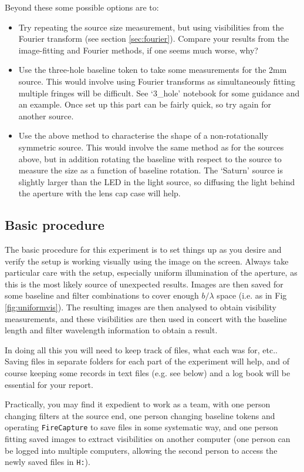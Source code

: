 \documentclass[11pt]{article}
\begin{document}
Beyond these some possible options are to:
\begin{itemize}
    \item Try repeating the source size measurement, but using visibilities from the Fourier transform (see section \ref{sec:fourier}). Compare your results from the image-fitting and Fourier methods, if one seems much worse, why?
    \item Use the three-hole baseline token to take some measurements for the 2mm source. This would involve using Fourier transforms as simultaneously fitting multiple fringes will be difficult. See `3\_hole' notebook for some guidance and an example. Once set up this part can be fairly quick, so try again for another source.
    \item Use the above method to characterise the shape of a non-rotationally symmetric source. This would involve the same method as for the sources above, but in addition rotating the baseline with respect to the source to measure the size as a function of baseline rotation. The `Saturn' source is slightly larger than the LED in the light source, so diffusing the light behind the aperture with the lens cap case will help.
\end{itemize}

\subsection{Basic procedure}

The basic procedure for this experiment is to set things up as you desire and verify the setup is working visually using the image on the screen. Always take particular care with the setup, especially uniform illumination of the aperture, as this is the most likely source of unexpected results. Images are then saved for some baseline and filter combinations to cover enough $b/\lambda$ space (i.e. as in Fig \ref{fig:uniformvis}). The resulting images are then analysed to obtain visibility measurements, and these visibilities are then used in concert with the baseline length and filter wavelength information to obtain a result.

In doing all this you will need to keep track of files, what each was for, etc.. Saving files in separate folders for each part of the experiment will help, and of course keeping some records in text files (e.g. see below) and a log book will be essential for your report.

Practically, you may find it expedient to work as a team, with one person changing filters at the source end, one person changing baseline tokens and operating \texttt{FireCapture} to save files in some systematic way, and one person fitting saved images to extract visibilities on another computer (one person can be logged into multiple computers, allowing the second person to access the newly saved files in \texttt{H:}).
\end{document}
